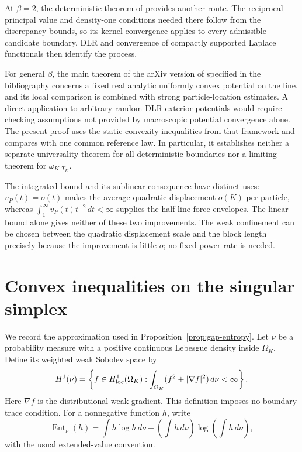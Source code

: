 \documentclass[11pt,reqno]{amsart}
\numberwithin{equation}{section}
\theoremstyle{definition}
\theoremstyle{remark}
\newcommand{\1}{\mathbf 1}
\newcommand{\Ent}{\operatorname{Ent}}
\newcommand{\dd}{\,d}
\begin{document}
At $\beta=2$, the deterministic theorem of \cite[Theorem~1.3]{KMD}
provides another route. The reciprocal principal value and density-one
conditions needed there follow from the discrepancy bounds, so its
kernel convergence applies to every admissible candidate boundary.
DLR and convergence of compactly supported Laplace functionals then
identify the process.

For general $\beta$, the main theorem of the arXiv version of
\cite{BEY} specified in the bibliography concerns a fixed real analytic uniformly convex potential
on the line, and its local comparison is combined with strong
particle-location estimates. A direct application to arbitrary
random DLR exterior potentials would require checking assumptions not
provided by macroscopic potential convergence alone.
The present proof uses the static convexity inequalities from that
framework and compares with one common reference law. In particular,
it establishes neither a separate universality theorem for all
deterministic boundaries nor a limiting theorem for
$\omega_{K,T_K}$.

The integrated bound and its sublinear consequence have distinct uses:
$v_P(t)=o(t)$ makes the average quadratic displacement $o(K)$ per
particle, whereas $\int_1^\infty v_P(t)t^{-2}\dd t<\infty$ supplies
the half-line force envelopes. The linear bound alone gives neither
of these two improvements. The weak confinement can be chosen between
the quadratic displacement scale and the block length precisely
because the improvement is little-$o$; no fixed power rate is needed.

\appendix
\section{Convex inequalities on the singular simplex}
\label{app:convex}

We record the approximation used in Proposition~\ref{prop:gap-entropy}.
Let $\nu$ be a probability measure with a positive continuous Lebesgue
density inside $\Omega_K$. Define its weighted weak Sobolev space by
\begin{equation}\label{eq:weighted-sobolev}
H^1(\nu)=\left\{f\in H^1_{\rm loc}(\Omega_K):
\int_{\Omega_K}(f^2+|\nabla f|^2)\dd\nu<\infty\right\}.
\end{equation}
Here $\nabla f$ is the distributional weak gradient.
This definition imposes no boundary trace condition.
For a nonnegative function $h$, write
\[
\Ent_\nu(h)=\int h\log h\dd\nu
 -\left(\int h\dd\nu\right)\log\left(\int h\dd\nu\right),
\]
with the usual extended-value convention.
\end{document}
